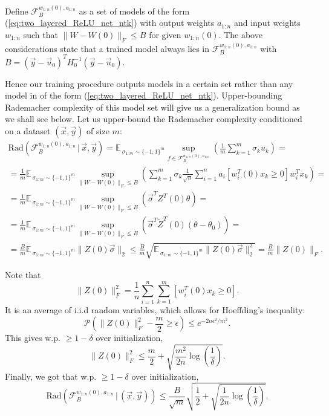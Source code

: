 \documentclass{article}
\newcommand{\PP}{\mathcal{P}}
\newcommand{\EE}{\mathbb{E}\,}
\newcommand{\FF}{\mathcal{F}}
\newcommand{\Rad}[2]{\mathrm{Rad}({#1} \, | \, {#2})}
\begin{document}
    Define $\FF_B^{w_{1:n}(0), a_{1:n}}$ as a set of models of the form (\ref{eq:two_layered_ReLU_net_ntk}) with output weights $a_{1:n}$ and input weights $w_{1:n}$ such that $\| W - W(0) \|_F \leq B$ for given $w_{1:n}(0)$.
    The above considerations state that a trained model always lies in $\FF_B^{w_{1:n}(0), a_{1:n}}$ with $B = (\vec y - \vec u_0)^T H_0^{-1} (\vec y - \vec u_0)$.
    
    Hence our training procedure outputs models in a certain set rather than any model in of the form (\ref{eq:two_layered_ReLU_net_ntk}).
    Upper-bounding Rademacher complexity of this model set will give us a generalization bound as we shall see below.
    Let us upper-bound the Rademacher complexity conditioned on a dataset $(\vec x, \vec y)$ of size $m$:
    \begin{multline}
        \Rad{\FF_B^{w_{1:n}(0), a_{1:n}}}{\vec x, \vec y} =
        \EE_{\sigma_{1:m} \sim \{-1,1\}^m} \sup_{f \in \FF_B^{w_{1:n}(0), a_{1:n}}} \left(\frac{1}{m} \sum_{k=1}^m \sigma_k u_k\right) =
        \\=
        \frac{1}{m} \EE_{\sigma_{1:m} \sim \{-1,1\}^m} \sup_{\| W - W(0) \|_F \leq B} \left(\sum_{k=1}^m \sigma_k \frac{1}{\sqrt{n}} \sum_{i=1}^n a_i [w_i^T(0) x_k \geq 0] w_i^{T} x_k\right) =
        \\=
        \frac{1}{m} \EE_{\sigma_{1:m} \sim \{-1,1\}^m} \sup_{\| W - W(0) \|_F \leq B} \left( \vec\sigma^T Z^{T}(0) \theta \right) =
        \\=
        \frac{1}{m} \EE_{\sigma_{1:m} \sim \{-1,1\}^m} \sup_{\| W - W(0) \|_F \leq B} \left( \vec\sigma^T \tilde Z^{T}(0) (\theta - \theta_0) \right) =
        \\=
        \frac{B}{m} \EE_{\sigma_{1:m} \sim \{-1,1\}^m} \| Z(0) \vec\sigma \|_2 \leq
        \frac{B}{m} \sqrt{\EE_{\sigma_{1:m} \sim \{-1,1\}^m} \| Z(0) \vec\sigma \|_2^2} =
        \frac{B}{m} \| Z(0) \|_F.
    \end{multline}
    
    Note that
    \begin{equation}
        \| Z(0) \|_F^2 =
        \frac{1}{n} \sum_{i=1}^n \sum_{k=1}^m [w_i^T(0) x_k \geq 0].
    \end{equation}
    It is an average of i.i.d random variables, which allows for Hoeffding's inequality:
    \begin{equation}
        \PP(\| Z(0) \|_F^2 - \frac{m}{2} \geq \epsilon) \leq 
        e^{-2n \epsilon^2 / m^2}.
    \end{equation}
    This gives w.p. $\geq 1-\delta$ over initialization,
    \begin{equation}
        \| Z(0) \|_F^2 \leq
        \frac{m}{2} + \sqrt{\frac{m^2}{2n} \log\left(\frac{1}{\delta}\right)}.
    \end{equation}
    Finally, we got that w.p. $\geq 1-\delta$ over initialization,
    \begin{equation}
        \Rad{\FF_B^{w_{1:n}(0), a_{1:n}}}{(\vec x, \vec y)} \leq
        \frac{B}{\sqrt{m}} \sqrt{\frac{1}{2} + \sqrt{\frac{1}{2n} \log\left(\frac{1}{\delta}\right)}}.
    \end{equation}
\end{document}
